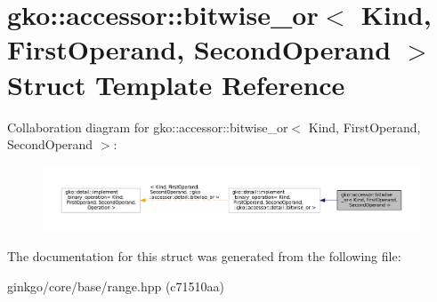 \hypertarget{structgko_1_1accessor_1_1bitwise__or}{}\section{gko\+:\+:accessor\+:\+:bitwise\+\_\+or$<$ Kind, First\+Operand, Second\+Operand $>$ Struct Template Reference}
\label{structgko_1_1accessor_1_1bitwise__or}


Collaboration diagram for gko\+:\+:accessor\+:\+:bitwise\+\_\+or$<$ Kind, First\+Operand, Second\+Operand $>$\+:
\nopagebreak
\begin{figure}[H]
\begin{center}
\leavevmode
\includegraphics[width=350pt]{structgko_1_1accessor_1_1bitwise__or__coll__graph}
\end{center}
\end{figure}


The documentation for this struct was generated from the following file\+:\begin{DoxyCompactItemize}
\item 
ginkgo/core/base/range.\+hpp (c71510aa)\end{DoxyCompactItemize}
